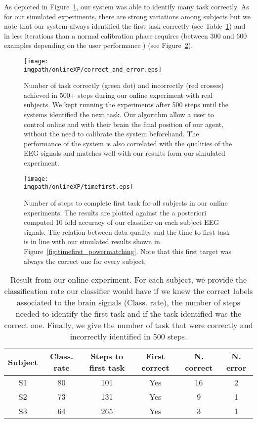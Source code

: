 As depicted in Figure~\ref{fig:correcterror_online}, our system was able to identify many task correctly. As for our simulated experiments, there are strong variations among subjects but we note that our system  always identified the first task correctly (see Table~\ref{tab:onlineXPsummary}) and in less iterations than a normal calibration phase requires (between 300 and 600 examples depending on the user performance \cite{chavarriaga2010learning,iturrate2010single}) (see Figure~\ref{fig:timefirst_online}).


\begin{figure}[!htbp]
\centering
\texttt{[image: \\imgpath/onlineXP/correct\_and\_error.eps]}
\caption{Number of task correctly (green dot) and incorrectly (red crosses) achieved in 500+ steps during our online experiment with real subjects. We kept running the experiments after 500 steps until the systems identified the next task. Our algorithm allow a user to control online and with their brain the final position of our agent, without the need to calibrate the system beforehand. The performance of the system is also correlated with the qualities of the EEG signals and matches well with our results form our simulated experiment.}
\label{fig:correcterror_online}
\end{figure} 


\begin{figure}[!htbp]
\centering
\texttt{[image: \\imgpath/onlineXP/timefirst.eps]}
\caption{Number of steps to complete first task for all subjects in our online experiments. The results are plotted against the a posteriori computed 10 fold accuracy of our classifier on each subject EEG signals. The relation between data quality and the time to first task is in line with our simulated results shown in Figure~\ref{fig:timefirst_powermatching}. Note that this first target was always the correct one for every subject.}
\label{fig:timefirst_online}
\end{figure} 


\begin{table}
\centering
{}
\begin{tabular}{c c c c c c}
    Subject & Class. rate & Steps to first task & First correct & N. correct & N. error\\ \hline
    S1 & 80 & 101 & Yes & 16 & 2\\ 
    S2 & 73 & 131 & Yes & 9 & 1\\
    S3 & 64 & 265 & Yes & 3 & 1\\
\end{tabular}
\caption{Result from our online experiment. For each subject, we provide the classification rate our classifier would have if we knew the correct labels associated to the brain signals (Class. rate), the number of steps needed to identify the first task and if the task identified was the correct one. Finally, we give the number of task that were correctly and incorrectly identified in 500 steps.} 
\label{tab:onlineXPsummary}
\end{table}

